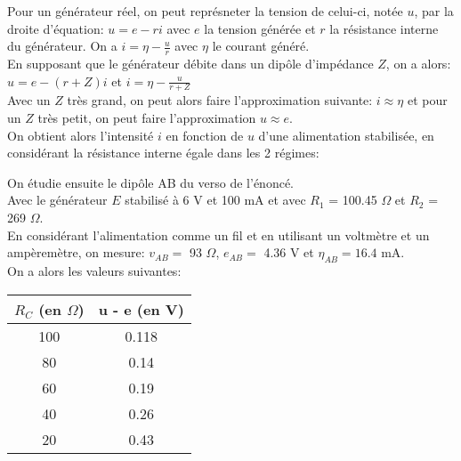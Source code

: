 \documentclass{scrartcl}
\begin{document}
				
				Pour un générateur réel, on peut représneter la tension de celui-ci, notée $u$, par la droite d'équation: $u = e - ri$ avec $e$ la tension générée et $r$ la résistance interne du générateur. On a $i = \eta - \frac{u}{r}$ avec $\eta$ le courant généré.\\
				En supposant que le générateur débite dans un dipôle d'impédance $Z$, on a alors: $u = e - (r + Z)i$ et $i = \eta - \frac{u}{r + Z}$\\
				Avec un $Z$ très grand, on peut alors faire l'approximation suivante: $i \approx \eta$ et pour un $Z$ très petit, on peut faire l'approximation $u \approx e$.\\
			On obtient alors l'intensité $i$ en fonction de $u$ d'une alimentation stabilisée, en considérant la résistance interne égale dans les 2 régimes:\\
				
			
			On étudie ensuite le dipôle AB du verso de l'énoncé.\\
			Avec le générateur $E$ stabilisé à 6 V et 100 mA et avec $R_1$ = 100.45 $\Omega$ et $R_2$ = 269 $\Omega$.\\
			
			En considérant l'alimentation comme un fil et en utilisant un voltmètre et un ampèremètre, on mesure: $v_{AB} =$ 93 $\Omega$, $e_{AB} =$ 4.36 V et $\eta_{AB} = 16.4$ mA.\\
			
			
			On a alors les valeurs suivantes:\\
			
			\begin{tabular}{|c|c|}
					\hline $R_C$ (en $\Omega$) & u - e (en V) \\
					\hline 100 & 0.118\\
					\hline 80 & 0.14\\
					\hline 60 & 0.19\\
					\hline 40 & 0.26\\
					\hline 20 & 0.43\\
					\hline
				\end{tabular}
			
\end{document}
